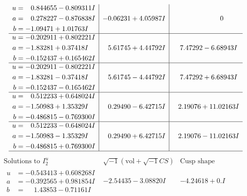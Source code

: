 \documentclass[1p]{elsarticle_modified}
\theoremstyle{definition}
\newcommand{\I}{\sqrt{-1}}
\begin{document}
$$\begin{array}{c|c|c}
\begin{aligned}
u &= \phantom{-}0.844655 - 0.809311 I \\
a &= \phantom{-}0.278227 - 0.876838 I \\
b &= -1.09471 + 1.01763 I\end{aligned}
 & -0.06231 + 4.05987 I & \phantom{-0.000000 } 0 \\ \hline\begin{aligned}
u &= -0.202911 + 0.802221 I \\
a &= -1.83281 + 0.37418 I \\
b &= -0.152437 + 0.165462 I\end{aligned}
 & \phantom{-}5.61745 + 4.44792 I & \phantom{-}7.47292 - 6.68943 I \\ \hline\begin{aligned}
u &= -0.202911 - 0.802221 I \\
a &= -1.83281 - 0.37418 I \\
b &= -0.152437 - 0.165462 I\end{aligned}
 & \phantom{-}5.61745 - 4.44792 I & \phantom{-}7.47292 + 6.68943 I \\ \hline\begin{aligned}
u &= \phantom{-}0.512233 + 0.648024 I \\
a &= -1.50983 + 1.35329 I \\
b &= -0.486815 - 0.769300 I\end{aligned}
 & \phantom{-}0.29490 - 6.42715 I & \phantom{-}2.19076 + 11.02163 I \\ \hline\begin{aligned}
u &= \phantom{-}0.512233 - 0.648024 I \\
a &= -1.50983 - 1.35329 I \\
b &= -0.486815 + 0.769300 I\end{aligned}
 & \phantom{-}0.29490 + 6.42715 I & \phantom{-}2.19076 - 11.02163 I\\
 \hline 
 \end{array}$$\newpage$$\begin{array}{c|c|c}  
\text{Solutions to }I^u_{2}& \I (\text{vol} + \sqrt{-1}CS) & \text{Cusp shape}\\
 \hline 
\begin{aligned}
u &= -0.543413 + 0.608268 I \\
a &= -0.392565 + 0.981854 I \\
b &= \phantom{-}1.43853 - 0.71161 I\end{aligned}
 & -2.54435 - 3.08820 I & -4.24618 + 0. I\phantom{ +0.000000I} \\ \hline\begin{aligned}

\end{aligned}
\end{array}$$
\end{document}
